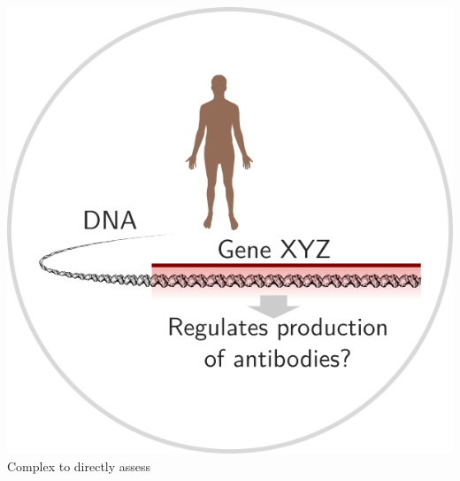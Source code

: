 \documentclass[aspectratio=169,9pt,handout]{beamer}
\begin{document}
\begin{frame}[c]
	\begin{minipage}[t]{.33\linewidth}
		\centering
		\includegraphics[width=1\linewidth]{aphylo-data-0.png} \\
		Complex to directly assess
	\end{minipage}\hfill
\end{frame}
\end{document}
